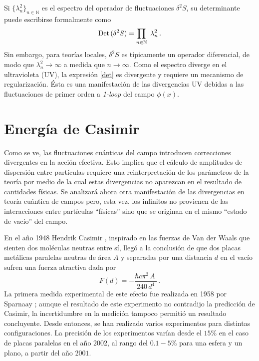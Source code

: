 Si $ \{ \lambda ^2 _n \} _{n \in \mathbb N}$ es el espectro del operador de fluctuaciones $ \delta ^2 S $, su determinante puede escribirse formalmente como
\begin{equation}\label{det}
{\rm Det}\,(\delta ^2 S) = \prod_{ n \in \mathbb N }\ \lambda ^2 _n\,.
\end{equation}
Sin embargo, para teorías locales, $\delta ^2 S$ es típicamente un operador diferencial, de modo que $\lambda ^2 _n\to\infty$ a medida que $n\to \infty$. Como el espectro diverge en el ultravioleta (UV), la expresión \eqref{det} es divergente y requiere un mecanismo de regularización. Ésta es una manifestación de las divergencias UV debidas a las fluctuaciones de primer orden a {\it 1-loop} del campo $\phi (x)$.


\section{Energía de Casimir}\label{sec.casimir}

Como se ve, las fluctuaciones cuánticas del campo introducen correcciones divergentes en la acción efectiva. Esto implica que el cálculo de amplitudes de dispersión entre partículas requiere una reinterpretación de los parámetros de la teoría por medio de la cual estas divergencias no aparezcan en el resultado de cantidades físicas. Se analizará ahora otra manifestación de las divergencias en teoría cuántica de campos pero, esta vez, los infinitos no provienen de las interacciones entre partículas ``físicas'' sino que se originan en el mismo ``estado de vacío'' del campo.


En el año 1948 Hendrik Casimir \cite{Casimir:1948dh}, inspirado en las fuerzas de Van der Waals que sienten dos moléculas neutras entre sí, llegó a la conclusión de que dos placas metálicas paralelas neutras de área $A$ y separadas por una distancia $d$ en el vacío sufren una fuerza atractiva dada por
\begin{equation}
		F(d) = -  \frac{\hbar c \pi ^2 \,A\  }{240 \, d^4}\,.
	\label{casimir.1}
\end{equation}
La primera medida experimental de este efecto fue realizada en 1958 por Sparnaay \cite{SPARNAAY1958751}; aunque el resultado de este experimento no contradijo la predicción de Casimir, la incertidumbre en la medición tampoco permitió un resultado concluyente. Desde entonces, se han realizado varios experimentos para distintas configuraciones. La precisión de los experimentos varían desde el $15 \%$ en el caso de placas paralelas \cite{casimir.placas.paralelas,articulo.casimir} en el año $2002$, al rango del $0.1-5 \%$ para una esfera y un plano, a partir del año $2001$\cite{casimir.cilindro1,PhysRevLett.81.4549,PhysRevD.60.111101,PhysRevA.62.052109}.

